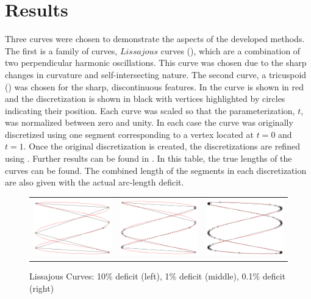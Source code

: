 \section{Results}
Three curves were chosen to demonstrate the aspects of the developed methods. The first is a family of curves, $Lissajous$ curves (), which are a combination of two perpendicular harmonic oscillations. This curve was chosen due to the sharp changes in curvature and self-intersecting nature. The second curve, a tricuspoid () was chosen for the sharp, discontinuous features. In  the curve is shown in red and the discretization is shown in black with vertices highlighted by circles indicating their position. Each curve was scaled so that the parameterization, $t$, was normalized between zero and unity. In each case the curve was originally discretized using one segment corresponding to a vertex located at $t=0$ and $t=1$. Once the original discretization is created, the discretizations are refined using . Further results can be found in . In this table, the true lengths of the curves can be found. The combined length of the segments in each discretization are also given with the actual arc-length deficit.

\begin{figure}[h!]
  \centering
  \begin{tabular}{ccc}
  \includegraphics[width=0.3\linewidth]{Figures/lissajous01.png} &
  \includegraphics[width=0.3\linewidth]{Figures/lissajous001.png} &
  \includegraphics[width=0.3\linewidth]{Figures/lissajous0001.png}
  \end{tabular}
  \caption{\label{fig:lissajous} Lissajous Curves: 10\% deficit (left), 1\% deficit (middle), 0.1\% deficit (right)}
\end{figure}

